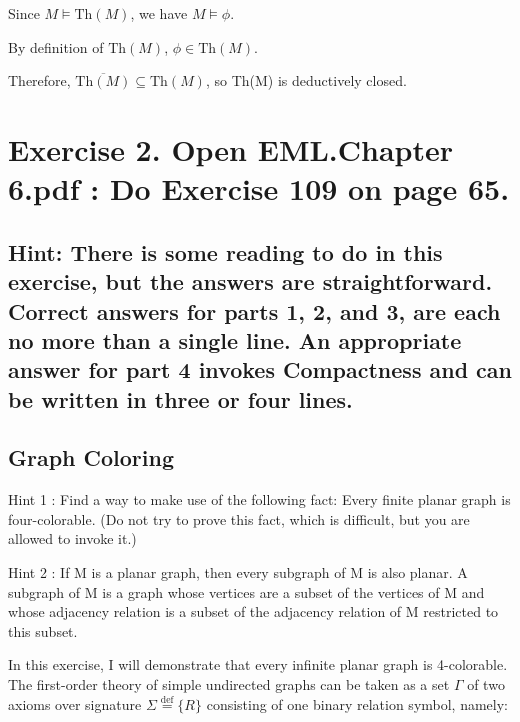 \documentclass{article}
\begin{document}
\vspace{1em}
Since $M \models \text{Th}(M)$, we have $M \models \phi$.

\vspace{1em}
By definition of $\text{Th}(M)$, $\phi \in \text{Th}(M)$.

\vspace{1em}
Therefore, $\overline{\text{Th}(M)} \subseteq \text{Th}(M)$, so Th(M) is deductively closed.


\newpage



\section*{Exercise 2. Open EML.Chapter 6.pdf : Do Exercise 109 on page 65.}

\subsection*{Hint: There is some reading to do in this exercise, but the answers are straightforward. Correct
answers for parts 1, 2, and 3, are each no more than a single line. An appropriate answer for part 4
invokes Compactness and can be written in three or four lines.}

\vspace{1em}

\begin{mdframed}
    \subsection*{Graph Coloring}

   Hint 1 : Find a way to make use of the following fact: Every ﬁnite planar graph is four-colorable.
    (Do not try to prove this fact, which is diﬃcult, but you are allowed to invoke it.)

    \vspace{1em}
    Hint 2 : If M is a planar graph, then every subgraph of M is also planar. A subgraph of M is a
    graph whose vertices are a subset of the vertices of M and whose adjacency relation is a subset
    of the adjacency relation of M restricted to this subset. 
  
\end{mdframed}

\vspace{1em}
In this exercise, I will demonstrate that every infinite planar graph is 4-colorable. The first-order theory of simple undirected graphs can be taken as a set $\Gamma$ of two axioms over signature $\Sigma \stackrel{\text{def}}{=} \{R\}$ consisting of one binary relation symbol, namely:
\end{document}
